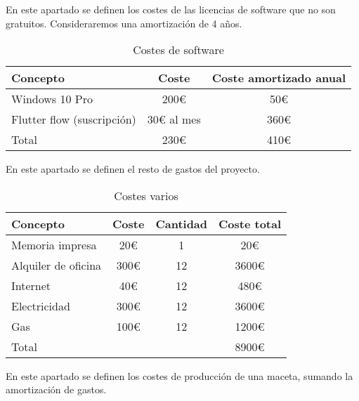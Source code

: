             En este apartado se definen los costes de las licencias de software que no son gratuitos. Consideraremos una amortización  de 4 años.
            \begin{table}[H]
                \centering
                \caption{Costes de software}
                \begin{tabular}{|l|c|c|}
                    \hline
                    Concepto & Coste & Coste amortizado anual \\
                    \hline
                    Windows 10 Pro & 200€ & 50€ \\
                    Flutter flow (suscripción) & 30€ al mes & 360€ \\
                    \hline
                    Total & 230€ & 410€ \\
                    \hline
                \end{tabular}
            \end{table}
            En este apartado se definen el resto de gastos del proyecto.
            \begin{table}[H]
                \centering
                \caption{Costes varios}
                \begin{tabular}{|l|c|c|c|}
                    \hline
                    Concepto & Coste & Cantidad & Coste total \\
                    \hline
                    Memoria impresa & 20€ & 1 & 20€ \\
                    Alquiler de oficina & 300€ & 12 & 3600€ \\
                    Internet & 40€ & 12 & 480€ \\
                    Electricidad & 300€ & 12 & 3600€ \\
                    Gas & 100€ & 12 & 1200€ \\
                    \hline
                    Total & & & 8900€ \\
                    \hline
                \end{tabular}
            \end{table}
            En este apartado se definen los costes de producción de una maceta, sumando la amortización de gastos.
